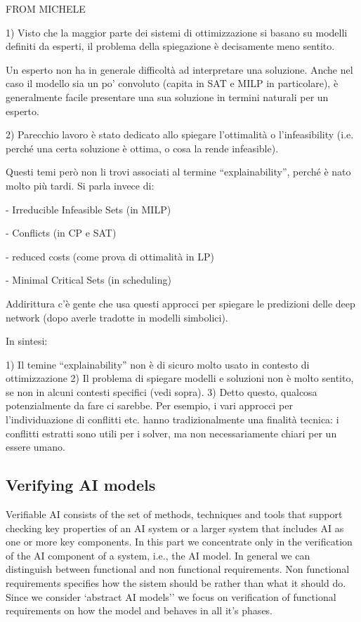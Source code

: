 \begin{description}
    {\color{red}FROM MICHELE \tt

      1) Visto che la maggior parte dei sistemi di ottimizzazione si
      basano su modelli definiti da esperti, il problema della
      spiegazione è decisamente meno sentito.

      Un esperto non ha in generale difficoltà ad interpretare una
      soluzione. Anche nel caso il modello sia un po’ convoluto
      (capita in SAT e MILP in particolare), è generalmente facile
      presentare una sua soluzione in termini naturali per un esperto.

      2) Parecchio lavoro è stato dedicato allo spiegare l’ottimalità
      o l’infeasibility (i.e. perché una certa soluzione è ottima, o
      cosa la rende infeasible).

      Questi temi però non li trovi associati al termine
      “explainability”, perché è nato molto più tardi. Si parla invece
      di:

      - Irreducible Infeasible Sets (in MILP)
      
      - Conflicts (in CP e SAT)
      
      - reduced costs (come  prova di ottimalità in LP)
      
      - Minimal Critical Sets (in scheduling)
      

      Addirittura c’è gente che usa questi approcci per spiegare le
      predizioni delle deep network (dopo averle tradotte in modelli
      simbolici).

In sintesi:

1) Il temine “explainability” non è di sicuro molto usato in contesto di ottimizzazione
2) Il problema di  spiegare modelli e soluzioni non è molto sentito, se non in alcuni contesti specifici (vedi sopra).
3) Detto questo, qualcosa potenzialmente da fare ci sarebbe. Per esempio, i vari approcci per l’individuazione di conflitti etc. hanno tradizionalmente una finalità tecnica: i  conflitti estratti sono utili per i solver, ma non necessariamente chiari per un  essere umano.
    }
  \end{description}
  
\subsection{Verifying AI models}


Verifiable AI consists of the set of methods, techniques and tools
that support checking key properties of an AI system or a larger
system that includes AI as one or more key components.  In this part
we concentrate only in the verification of the AI component of a
system, i.e., the AI model. In general we can distinguish between
functional and non functional requirements. Non functional
requirements specifies how the sistem should be rather than what it
should do. Since we consider `abstract AI models'' we focus on
verification of functional requirements on how the model and behaves
in all it's phases. 
  
